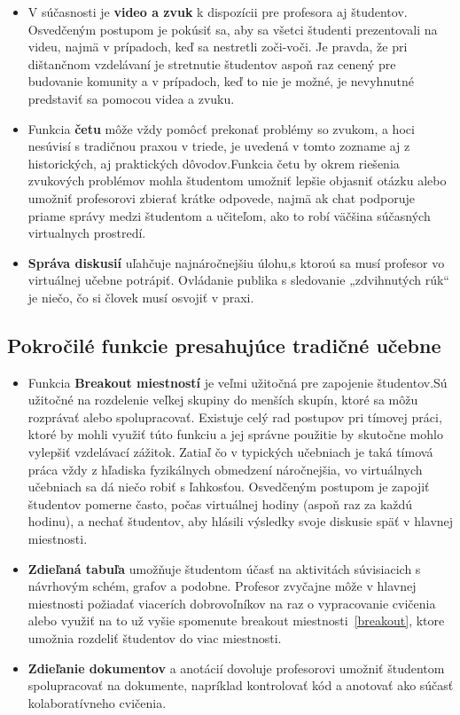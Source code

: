 \documentclass[10pt,twoside,slovak,a4paper]{article}
\begin{document}
\begin{itemize}
\item V súčasnosti je \textbf{video a zvuk} k dispozícii pre profesora aj študentov. Osvedčeným postupom je pokúsiť sa,
aby sa všetci študenti prezentovali na videu, najmä v prípadoch, keď sa nestretli zoči-voči. Je pravda,
že pri dištančnom vzdelávaní je stretnutie študentov aspoň raz cenený pre budovanie komunity a v prípadoch,
keď to nie je možné, je nevyhnutné predstaviť sa pomocou videa a zvuku.\cite{VCf}

	\item Funkcia \textbf{četu} môže vždy pomôcť prekonať problémy so zvukom, a hoci nesúvisí s tradičnou praxou v triede, 
je uvedená v tomto zozname aj z historických, aj praktických dôvodov.Funkcia četu by okrem riešenia zvukových problémov 
mohla študentom umožniť lepšie objasniť otázku alebo umožniť profesorovi zbierať krátke odpovede, najmä ak chat podporuje 
priame správy medzi študentom a učiteľom, ako to robí väčšina súčasných virtualnych prostredí.\cite{VCf}

	\item \textbf{Správa diskusií} uľahčuje najnáročnejšiu úlohu,s ktoroú sa musí profesor vo virtuálnej učebne potrápiť.
Ovládanie publika s sledovanie „zdvihnutých rúk“  je niečo, čo si človek musí osvojiť v praxi.\cite{VCf}
\end{itemize}

\subsection{Pokročilé funkcie presahujúce tradičné učebne} \label{Pokr}
\begin{itemize}
	\item Funkcia \textbf{Breakout miestností} je veľmi užitočná pre zapojenie študentov.Sú užitočné na rozdelenie veľkej 
	skupiny do menších skupín, ktoré sa môžu rozprávať alebo spolupracovať. Existuje celý rad postupov 
	pri tímovej práci, ktoré by mohli využiť túto funkciu a jej správne použitie by skutočne mohlo vylepšiť 
	vzdelávací zážitok. Zatiaľ čo v typických učebniach je taká tímová práca vždy z hľadiska fyzikálnych obmedzení náročnejšia,
	vo virtuálnych učebniach sa dá niečo robiť s ľahkosťou. Osvedčeným postupom je zapojiť študentov pomerne často, počas virtuálnej hodiny (aspoň raz za každú hodinu),
	a nechať študentov, aby hlásili výsledky svoje diskusie späť v hlavnej miestnosti.\cite{VCf} \label{breakout}

	\item \textbf{Zdieľaná tabuľa} umožňuje študentom účasť na aktivitách súvisiacich s návrhovým schém,
	grafov a podobne. Profesor zvyčajne môže v hlavnej miestnosti požiadať viacerích dobrovoľníkov na raz o vypracovanie cvičenia
	alebo využiť na to už vyšie spomenute breakout miestnosti~\ref{breakout}, ktore umožnia rozdeliť študentov do viac miestnosti.

	\item \textbf{Zdieľanie dokumentov} a anotácií dovoluje profesorovi umožniť študentom spolupracovať na dokumente,
	napríklad kontrolovať kód a anotovať ako súčasť kolaboratívneho cvičenia.
	
\end{itemize}	
\end{document}

